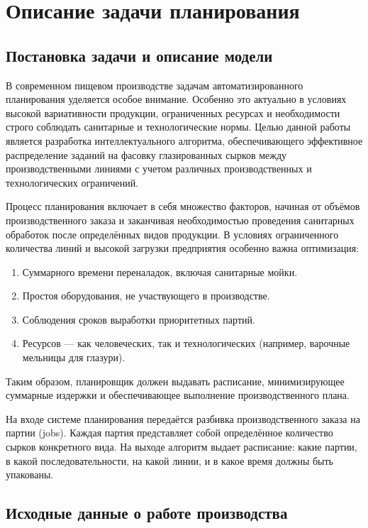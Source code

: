\chapter{Описание задачи планирования}
\label{ch:chapter2}

\section{Постановка задачи и описание модели}

В современном пищевом производстве задачам автоматизированного планирования уделяется особое внимание. Особенно это актуально в условиях высокой вариативности продукции, ограниченных ресурсах и необходимости строго соблюдать санитарные и технологические нормы. Целью данной работы является разработка интеллектуального алгоритма, обеспечивающего эффективное распределение заданий на фасовку глазированных сырков между производственными линиями с учетом различных производственных и технологических ограничений.

Процесс планирования включает в себя множество факторов, начиная от объёмов производственного заказа и заканчивая необходимостью проведения санитарных обработок после определённых видов продукции. В условиях ограниченного количества линий и высокой загрузки предприятия особенно важна оптимизация:

\begin{enumerate}
	\item Суммарного времени переналадок, включая санитарные мойки.
	\item Простоя оборудования, не участвующего в производстве.
	\item Соблюдения сроков выработки приоритетных партий.
	\item Ресурсов — как человеческих, так и технологических (например, варочные мельницы для глазури).
\end{enumerate}

Таким образом, планировщик должен выдавать расписание, минимизирующее суммарные издержки и обеспечивающее выполнение производственного плана.

На входе системе планирования передаётся разбивка производственного заказа на партии (jobs). Каждая партия представляет собой определённое количество сырков конкретного вида. На выходе алгоритм выдает расписание: какие партии, в какой последовательности, на какой линии, и в какое время должны быть упакованы.

\section{Исходные данные о работе производства}

